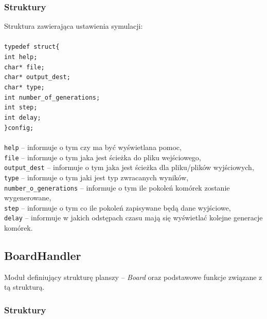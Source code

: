 \documentclass{article}
\begin{document}
\subsubsection{Struktury}
Struktura zawierająca ustawienia symulacji: \\\\
\texttt{typedef struct\{\\
	 \hspace*{10mm}int help;\\
	 \hspace*{10mm}char* file;\\
	 \hspace*{10mm}char* output\_dest;\\
	 \hspace*{10mm}char* type;\\
	 \hspace*{10mm}int number\_of\_generations;\\
	 \hspace*{10mm}int step;\\
	 \hspace*{10mm}int delay;\\
\}config;\\}
\\
\texttt{help} -- informuje o tym czy ma być wyświetlana pomoc,\\
\texttt{file} -- informuje o tym jaka jest ścieżka do pliku wejściowego,\\
\texttt{output\_dest} --  informuje o tym jaka jest ścieżka dla pliku/plików wyjściowych,\\
\texttt{type} -- informuje o tym jaki jest typ zwracanych wyników,\\
\texttt{number\_o\_generations} -- informuje o tym ile pokoleń komórek zostanie wygenerowane,\\
\texttt{step} -- informuje o tym co ile pokoleń zapisywane będą dane wyjściowe,\\
\texttt{delay} -- informuje w jakich odstępach czasu mają się wyświetlać kolejne generacje komórek.\\

\subsection{BoardHandler}
Moduł definiujący strukturę planszy -- \textit{Board} oraz podstawowe funkcje związane z tą strukturą.

\subsubsection{Struktury}
\end{document}
